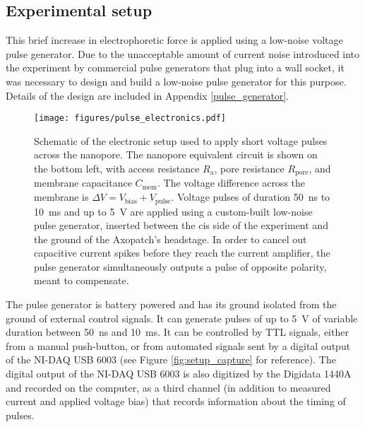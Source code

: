\subsection{Experimental setup}

This brief increase in electrophoretic force is applied using a low-noise voltage pulse generator.  Due to the unacceptable amount of current noise introduced into the experiment by commercial pulse generators that plug into a wall socket, it was necessary to design and build a low-noise pulse generator for this purpose.  Details of the design are included in Appendix \ref{pulse_generator}.

\begin{figure}[h]
\begin{centering}
\texttt{[image: figures/pulse\_electronics.pdf]}
\caption[Electronic setup for low-noise pulses across a nanopore]{Schematic of the electronic setup used to apply short voltage pulses across the nanopore.  The nanopore equivalent circuit is shown on the bottom left, with access resistance $R_{\text{a}}$, pore resistance $R_{\text{pore}}$, and membrane capacitance $C_{\text{mem}}$.  The voltage difference across the membrane is $\Delta V = V_{\text{bias}} + V_{\text{pulse}}$.  Voltage pulses of duration \SI{50}{\ns} to \SI{10}{\ms} and up to \SI{5}{\V} are applied using a custom-built low-noise pulse generator, inserted between the cis side of the experiment and the ground of the Axopatch's headstage.  In order to cancel out capacitive current spikes before they reach the current amplifier, the pulse generator simultaneously outputs a pulse of opposite polarity, meant to compensate.}
\label{fig:helicase_pulse_setup}
\end{centering}
\end{figure}

The pulse generator is battery powered and has its ground isolated from the ground of external control signals.  It can generate pulses of up to \SI{5}{\V} of variable duration between \SI{50}{\ns} and \SI{10}{\ms}.  It can be controlled by TTL signals, either from a manual push-button, or from automated signals sent by a digital output of the NI-DAQ USB 6003 (see Figure \ref{fig:setup_capture} for reference).  The digital output of the NI-DAQ USB 6003 is also digitized by the Digidata 1440A and recorded on the computer, as a third channel (in addition to measured current and applied voltage bias) that records information about the timing of pulses.

